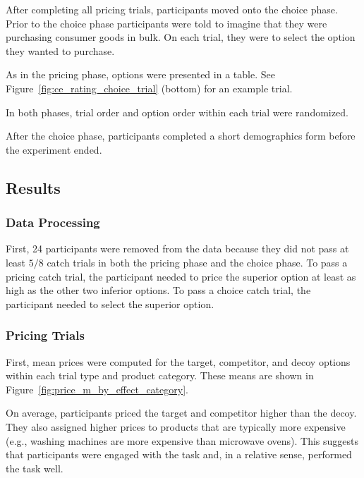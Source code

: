 After completing all pricing trials, participants moved onto the choice phase. Prior to the choice phase participants were told to imagine that they were purchasing consumer goods in bulk. On each trial, they were to select the option they wanted to purchase. 

As in the pricing phase, options were presented in a table. See Figure~\ref{fig:ce_rating_choice_trial} (bottom) for an example trial.

In both phases, trial order and option order within each trial were randomized. 

After the choice phase, participants completed a short demographics form before the experiment ended. 

\subsection{Results}

\subsubsection{Data Processing}

First, 24 participants were removed from the data because they did not pass at least $5/8$ catch trials in both the pricing phase and the choice phase. To pass a pricing catch trial, the participant needed to price the superior option at least as high as the other two inferior options. To pass a choice catch trial, the participant needed to select the superior option. 

\subsubsection{Pricing Trials}

First, mean prices were computed for the target, competitor, and decoy options within each trial type and product category. These means are shown in Figure~\ref{fig:price_m_by_effect_category}.

On average, participants priced the target and competitor higher than the decoy. They also assigned higher prices to products that are typically more expensive (e.g., washing machines are more expensive than microwave ovens). This suggests that participants were engaged with the task and, in a relative sense, performed the task well.

